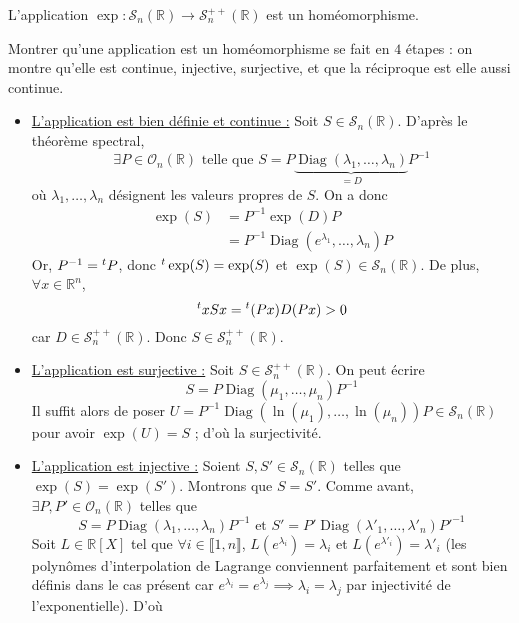 	\begin{theorem}
		L'application $\exp : \mathcal{S}_n(\mathbb{R}) \rightarrow \mathcal{S}^{++}_n(\mathbb{R})$ est un homéomorphisme.
	\end{theorem}

	\begin{demonstration}
		Montrer qu'une application est un homéomorphisme se fait en $4$ étapes : on montre qu'elle est continue, injective, surjective, et que la réciproque est elle aussi continue.
		\begin{itemize}
			\item \uline{L'application est bien définie et continue :} Soit $S \in \mathcal{S}_n(\mathbb{R})$. D'après le théorème spectral,
			\[ \exists P \in \mathcal{O}_n(\mathbb{R}) \text{ telle que } S = P \underbrace{\operatorname{Diag}(\lambda_1, \dots, \lambda_n)}_{= D}P^{-1} \]
			où $\lambda_1, \dots, \lambda_n$ désignent les valeurs propres de $S$. On a donc
			\begin{align*}
				\exp(S) &= P^{-1} \exp(D) P \\
				&= P^{-1} \operatorname{Diag}(e^{\lambda_1}, \dots, \lambda_n) P
			\end{align*}
			Or, $P^{-1} = \mathstrut ^t P$, donc $\mathstrut ^t \exp(S) = \exp(S)$ et $\exp(S) \in \mathcal{S}_n(\mathbb{R})$. De plus, $\forall x \in \mathbb{R}^n$,
			\[ \mathstrut ^t x S x = \mathstrut ^t (Px) D (Px) > 0 \]
			car $D \in \mathcal{S}^{++}_n(\mathbb{R})$. Donc $S \in \mathcal{S}^{++}_n(\mathbb{R})$.
			\item \uline{L'application est surjective :} Soit $S \in \mathcal{S}^{++}_n(\mathbb{R})$. On peut écrire
			\[ S = P \operatorname{Diag}(\mu_1, \dots, \mu_n) P^{-1} \]
			Il suffit alors de poser $U = P^{-1} \operatorname{Diag}(\ln(\mu_1), \dots, \ln(\mu_n)) P \in \mathcal{S}_n(\mathbb{R})$ pour avoir $\exp(U) = S$ ; d'où la surjectivité.
			\item \uline{L'application est injective :} Soient $S, S' \in \mathcal{S}_n(\mathbb{R})$ telles que $\exp(S) = \exp(S')$. Montrons que $S = S'$. Comme avant, $\exists P, P' \in \mathcal{O}_n(\mathbb{R})$ telles que
			\[ S = P \operatorname{Diag}(\lambda_1, \dots, \lambda_n) P^{-1} \text{ et } S' = P' \operatorname{Diag}(\lambda'_1, \dots, \lambda'_n) P'^{-1} \]
			Soit $L \in \mathbb{R}[X]$ tel que $\forall i \in \llbracket 1, n \rrbracket$, $L(e^{\lambda_i}) = \lambda_i$ et $L(e^{\lambda'_i}) = \lambda'_i$ (les polynômes d'interpolation de Lagrange conviennent parfaitement et sont bien définis dans le cas présent car $e^{\lambda_i} = e^{\lambda_j} \implies \lambda_i = \lambda_j$ par injectivité de l'exponentielle). D'où

\end{itemize}
\end{demonstration}
